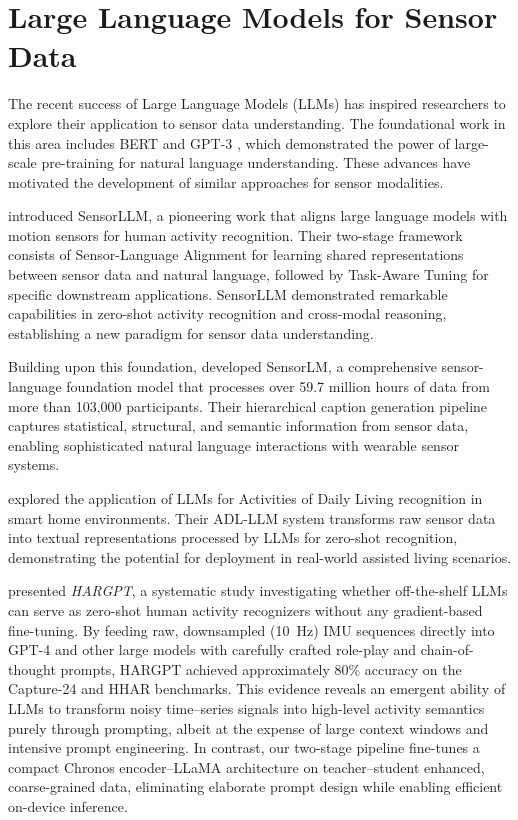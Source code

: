 \section{Large Language Models for Sensor Data}

\hspace{2em}The recent success of Large Language Models (LLMs) has inspired researchers to explore their application to sensor data understanding. The foundational work in this area includes BERT \cite{Devlin2019BERT} and GPT-3 \cite{Brown2020GPT3}, which demonstrated the power of large-scale pre-training for natural language understanding. These advances have motivated the development of similar approaches for sensor modalities.

\cite{li2024sensorllm} introduced SensorLLM, a pioneering work that aligns large language models with motion sensors for human activity recognition. Their two-stage framework consists of Sensor-Language Alignment for learning shared representations between sensor data and natural language, followed by Task-Aware Tuning for specific downstream applications. SensorLLM demonstrated remarkable capabilities in zero-shot activity recognition and cross-modal reasoning, establishing a new paradigm for sensor data understanding.

Building upon this foundation, \cite{Zhang2025SensorLM} developed SensorLM, a comprehensive sensor-language foundation model that processes over 59.7 million hours of data from more than 103,000 participants. Their hierarchical caption generation pipeline captures statistical, structural, and semantic information from sensor data, enabling sophisticated natural language interactions with wearable sensor systems.

\cite{Civitarese2024ADLLLM} explored the application of LLMs for Activities of Daily Living recognition in smart home environments. Their ADL-LLM system transforms raw sensor data into textual representations processed by LLMs for zero-shot recognition, demonstrating the potential for deployment in real-world assisted living scenarios.

\cite{Ji2024HARGPT} presented \textit{HARGPT}, a systematic study investigating whether off-the-shelf LLMs can serve as zero-shot human activity recognizers without any gradient-based fine-tuning. By feeding raw, downsampled (\SI{10}{\hertz}) IMU sequences directly into GPT-4 and other large models with carefully crafted role-play and chain-of-thought prompts, HARGPT achieved approximately 80\% accuracy on the Capture-24 and HHAR benchmarks. This evidence reveals an emergent ability of LLMs to transform noisy time–series signals into high-level activity semantics purely through prompting, albeit at the expense of large context windows and intensive prompt engineering. In contrast, our two-stage pipeline fine-tunes a compact Chronos encoder--LLaMA architecture on teacher--student enhanced, coarse-grained data, eliminating elaborate prompt design while enabling efficient on-device inference.

